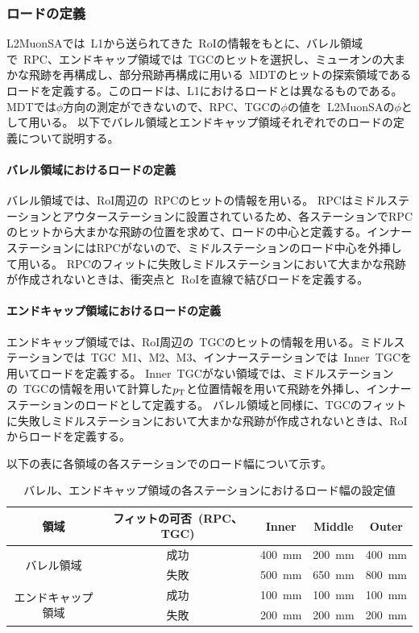 \subsubsection{ロードの定義}
L2MuonSAでは~L1から送られてきた~RoIの情報をもとに、バレル領域で~RPC、エンドキャップ領域では~TGCのヒットを選択し、ミューオンの大まかな飛跡を再構成し、部分飛跡再構成に用いる~MDTのヒットの探索領域であるロードを定義する。このロードは、L1におけるロードとは異なるものである。MDTでは$\phi$方向の測定ができないので、RPC、TGCの$\phi$の値を~L2MuonSAの$\phi$として用いる。
以下でバレル領域とエンドキャップ領域それぞれでのロードの定義について説明する。

\paragraph{バレル領域におけるロードの定義}
バレル領域では、RoI周辺の~RPCのヒットの情報を用いる。
RPCはミドルステーションとアウターステーションに設置されているため、各ステーションでRPCのヒットから大まかな飛跡の位置を求めて、ロードの中心と定義する。インナーステーションにはRPCがないので、ミドルステーションのロード中心を外挿して用いる。
RPCのフィットに失敗しミドルステーションにおいて大まかな飛跡が作成されないときは、衝突点と~RoIを直線で結びロードを定義する。

\paragraph{エンドキャップ領域におけるロードの定義}
エンドキャップ領域では、RoI周辺の~TGCのヒットの情報を用いる。ミドルステーションでは~TGC~M1、M2、M3、インナーステーションでは~Inner~TGCを用いてロードを定義する。
Inner~TGCがない領域では、ミドルステーションの~TGCの情報を用いて計算した$p_\mathrm{T}$と位置情報を用いて飛跡を外挿し、インナーステーションのロードとして定義する。
バレル領域と同様に、TGCのフィットに失敗しミドルステーションにおいて大まかな飛跡が作成されないときは、RoIからロードを定義する。

以下の表に各領域の各ステーションでのロード幅について示す。

\begin{table}[H]
    \centering
    \begin{tabular}{|c|c||c|c|c|} \hline
     領域 & フィットの可否~(RPC、TGC) & Inner & Middle & Outer  \\ \hline \hline
     \multirow{2}{*}{バレル領域} & 成功 & \SI{400}{\mm} & \SI{200}{\mm} &\SI{400}{\mm} \\
                                & 失敗 & \SI{500}{\mm} & \SI{650}{\mm} & \SI{800}{\mm} \\ \hline
     \multirow{2}{*}{エンドキャップ領域} & 成功 & \SI{100}{\mm} & \SI{100}{\mm} & \SI{100}{\mm} \\
                                        & 失敗 & \SI{200}{\mm} & \SI{200}{\mm} & \SI{200}{\mm} \\ \hline
    \end{tabular}
    \caption{バレル、エンドキャップ領域の各ステーションにおけるロード幅の設定値}
    \label{table1}
\end{table}




